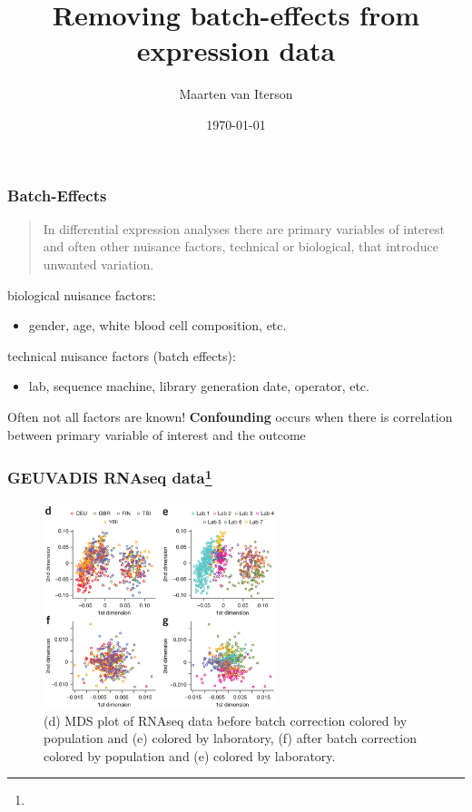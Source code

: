 \documentclass{beamer}
\title{Removing batch-effects from expression data}
\author{Maarten van Iterson}
\institute[LUMC]{\\Leiden University Medical Center\\Department of Molecular Epidemiology}
\date{\today}
\newcommand\footcite[1]{\footnote{\tiny{\bibentry{#1}}}\label{\thepage:#1}}
\newenvironment{wideitemize}{\itemize\addtolength{\itemsep}{0.2in}}{\enditemize}
\begin{document}

\frame{\titlepage}

\begin{frame}
  \frametitle{Batch-Effects}
  \begin{quote}
    In differential expression analyses there are primary variables of interest and often other nuisance factors, technical or biological, that introduce unwanted variation.
  \end{quote}
  \pause
  \begin{wideitemize}
  \item biological nuisance factors:
    \begin{itemize}
    \item gender, age, white blood cell composition, etc.
    \end{itemize}
    \pause
  \item technical nuisance factors (batch effects):
    \begin{itemize}
    \item lab, sequence machine, library generation date, operator, etc.
    \end{itemize}
    \pause
  \item Often not all factors are known!
  \end{wideitemize}
  \pause
  \textbf{Confounding} occurs when there is correlation between primary variable of interest and the outcome
\end{frame}

\begin{frame}
  \frametitle{GEUVADIS RNAseq data\footcite{Hoen2013}}
  \begin{figure}
    \centering
    \includegraphics[width=0.6\textwidth]{geuvadis}
    \caption{(d) MDS plot of RNAseq data before batch correction colored by population and (e) colored by laboratory, (f) after batch correction colored by population and (e) colored by laboratory.}
  \end{figure}
\end{frame}
\end{document}
